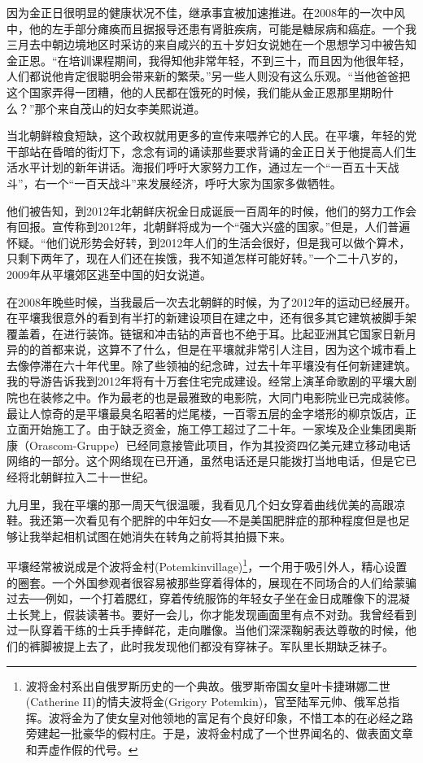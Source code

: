 因为金正日很明显的健康状况不佳，继承事宜被加速推进。在2008年的一次中风中，他的左手部分瘫痪而且据报导还患有肾脏疾病，可能是糖尿病和癌症。一个我三月去中朝边境地区时采访的来自咸兴的五十岁妇女说她在一个思想学习中被告知金正恩。“在培训课程期间，我得知他非常年轻，不到三十，而且因为他很年轻，人们都说他肯定很聪明会带来新的繁荣。”另一些人则没有这么乐观。“当他爸爸把这个国家弄得一团糟，他的人民都在饿死的时候，我们能从金正恩那里期盼什么？”那个来自茂山的妇女李美熙说道。

当北朝鲜粮食短缺，这个政权就用更多的宣传来喂养它的人民。在平壤，年轻的党干部站在昏暗的街灯下，念念有词的诵读那些要求背诵的金正日关于他提高人们生活水平计划的新年讲话。海报们呼吁大家努力工作，通过左一个“一百五十天战斗”，右一个“一百天战斗”来发展经济，呼吁大家为国家多做牺牲。

他们被告知，到2012年北朝鲜庆祝金日成诞辰一百周年的时候，他们的努力工作会有回报。宣传称到2012年，北朝鲜将成为一个“强大兴盛的国家。”但是，人们普遍怀疑。“他们说形势会好转，到2012年人们的生活会很好，但是我可以做个算术，只剩下两年了，现在人们还在挨饿，我不知道怎样可能好转。”一个二十八岁的，2009年从平壤郊区逃至中国的妇女说道。

在2008年晚些时候，当我最后一次去北朝鲜的时候，为了2012年的运动已经展开。在平壤我很意外的看到有半打的新建设项目在建之中，还有很多其它建筑被脚手架覆盖着，在进行装饰。链锯和冲击钻的声音也不绝于耳。比起亚洲其它国家日新月异的的首都来说，这算不了什么，但是在平壤就非常引人注目，因为这个城市看上去像停滞在六十年代里。除了些领袖的纪念碑，过去十年平壤没有任何新建建筑。我的导游告诉我到2012年将有十万套住宅完成建设。经常上演革命歌剧的平壤大剧院也在装修之中。作为最老的也是最雅致的电影院，大同门电影院业已完成装修。最让人惊奇的是平壤最臭名昭著的烂尾楼，一百零五层的金字塔形的柳京饭店，正立面开始施工了。由于缺乏资金，施工停工超过了二十年。一家埃及企业集团奥斯康（Orascom-Gruppe）已经同意接管此项目，作为其投资四亿美元建立移动电话网络的一部分。这个网络现在已开通，虽然电话还是只能拨打当地电话，但是它已经将北朝鲜拉入二十一世纪。

九月里，我在平壤的那一周天气很温暖，我看见几个妇女穿着曲线优美的高跟凉鞋。我还第一次看见有个肥胖的中年妇女──不是美国肥胖症的那种程度但是也足够让我举起相机试图在她消失在转角之前将其拍摄下来。

平壤经常被说成是个波将金村(Potemkinvillage)\footnote{波将金村系出自俄罗斯历史的一个典故。俄罗斯帝国女皇叶卡捷琳娜二世(Catherine II)的情夫波将金(Grigory Potemkin)，官至陆军元帅、俄军总指挥。波将金为了使女皇对他领地的富足有个良好印象，不惜工本的在必经之路旁建起一批豪华的假村庄。于是，波将金村成了一个世界闻名的、做表面文章和弄虚作假的代号。}，一个用于吸引外人，精心设置的圈套。一个外国参观者很容易被那些穿着得体的，展现在不同场合的人们给蒙骗过去──例如，一个打着腮红，穿着传统服饰的年轻女子坐在金日成雕像下的混凝土长凳上，假装读著书。要好一会儿，你才能发现画面里有点不对劲。我曾经看到过一队穿着干练的士兵手捧鲜花，走向雕像。当他们深深鞠躬表达尊敬的时候，他们的裤脚被提上去了，此时我发现他们都没有穿袜子。军队里长期缺乏袜子。

